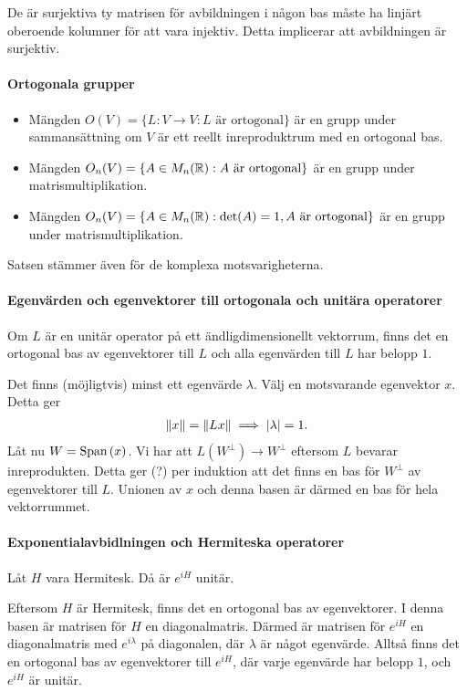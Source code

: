 De är surjektiva ty matrisen för avbildningen i någon bas måste ha linjärt oberoende kolumner för att vara injektiv. Detta implicerar att avbildningen är surjektiv.

\paragraph{Ortogonala grupper}
\begin{itemize}
	\item Mängden $O(V) = \{L: V\to V: L\text{ är ortogonal}\}$ är en grupp under sammansättning om $V$ är ett reellt inreproduktrum med en ortogonal bas.
	\item Mängden $O_{n}(V) = \{A\in M_{n}(\mathbb{R}): A\text{ är ortogonal}\}$ är en grupp under matrismultiplikation.
	\item Mängden $O_{n}(V) = \{A\in M_{n}(\mathbb{R}): \text{det}(A) = 1, A\text{ är ortogonal}\}$ är en grupp under matrismultiplikation.
\end{itemize}

Satsen stämmer även för de komplexa motsvarigheterna.

\proof

\paragraph{Egenvärden och egenvektorer till ortogonala och unitära operatorer}
Om $L$ är en unitär operator på ett ändligdimensionellt vektorrum, finns det en ortogonal bas av egenvektorer till $L$ och alla egenvärden till $L$ har belopp $1$.

\proof
Det finns (möjligtvis) minst ett egenvärde $\lambda$. Välj en motsvarande egenvektor $x$. Detta ger
\begin{align*}
	\norm{x} = \norm{Lx} \implies \abs{\lambda} = 1.
\end{align*}
Låt nu $W = \text{Span}\left(x\right)$. Vi har att $L(W^{\perp})\to W^{\perp}$ eftersom $L$ bevarar inreprodukten. Detta ger (?) per induktion att det finns en bas för $W^{\perp}$ av egenvektorer till $L$. Unionen av $x$ och denna basen är därmed en bas för hela vektorrummet.

\paragraph{Exponentialavbidlningen och Hermiteska operatorer}
Låt $H$ vara Hermitesk. Då är $e^{iH}$ unitär.

\proof
Eftersom $H$ är Hermitesk, finns det en ortogonal bas av egenvektorer. I denna basen är matrisen för $H$ en diagonalmatris. Därmed är matrisen för $e^{iH}$ en diagonalmatris med $e^{i\lambda}$ på diagonalen, där $\lambda$ är något egenvärde. Alltså finns det en ortogonal bas av egenvektorer till $e^{iH}$, där varje egenvärde har belopp $1$, och $e^{iH}$ är unitär.

